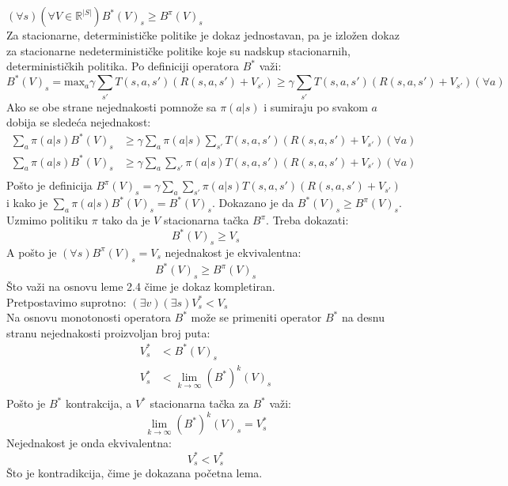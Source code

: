 \documentclass[a4paper,fleqn,12pt]{JMThesis}
\theoremstyle{plain}
\theoremstyle{definition}
\theoremstyle{definition}
\begin{document}
\lem $(\forall s) (\forall V \in \mathbb{R}^{|S|}) B^*(V)_s \geq B^{\pi}(V)_s$ \\
Za stacionarne, determinističke politike je dokaz jednostavan, pa je izložen dokaz za stacionarne nedeterminističke politike
koje su nadskup stacionarnih, determinističkih politika.
Po definiciji operatora $B^*$ važi:
\[
	B^*(V)_s = \text{max}_a \gamma \sum_{s'}T(s,a,s')(R(s,a,s')+V_{s'}) \geq \gamma \sum_{s'}T(s,a,s')(R(s,a,s')+V_{s'}) (\forall a) 
\]
Ako se obe strane nejednakosti pomnože sa $\pi(a|s)$ i sumiraju po svakom $a$ dobija se sledeća nejednakost:
\[
	\begin{split}
		\sum_{a} \pi(a|s) B^*(V)_s &\geq \gamma \sum_{a} \pi(a|s) \sum_{s'}T(s,a,s')(R(s,a,s')+V_{s'}) (\forall a)\\
		\sum_{a} \pi(a|s) B^*(V)_s &\geq \gamma \sum_{a} \sum_{s'}\pi(a|s) T(s,a,s')(R(s,a,s')+V_{s'}) (\forall a)\\
	\end{split}
\]
Pošto je definicija $B^{\pi}(V)_s = \gamma \sum_{a} \sum_{s'}\pi(a|s) T(s,a,s')(R(s,a,s')+V_{s'})$ i kako je $\sum_{a} \pi(a|s) B^*(V)_s = B^*(V)_s$.
Dokazano je da $B^*(V)_s \geq B^{\pi}(V)_s$.
\\
Uzmimo politiku $\pi$ tako da je $V$ stacionarna tačka $B^{\pi}$.
Treba dokazati:
\[ B^*(V)_s \geq V_s \]
A pošto je $(\forall s) B^{\pi}(V)_s = V_s$ nejednakost je ekvivalentna:
\[ B^*(V)_s \geq B^{\pi}(V)_s \]
Što važi na osnovu leme 2.4 čime je dokaz kompletiran.
\\
Pretpostavimo suprotno: $(\exists v)(\exists s) V^*_s < V_s$\\
Na osnovu monotonosti operatora $B^*$ može se primeniti operator $B^*$ na desnu stranu nejednakosti proizvoljan broj puta:
\[
	\begin{split}
		V^*_s &< B^*(V)_s\\
		V^*_s &< \lim_{k \to \infty}(B^*)^k(V)_s\\
	\end{split}
\]
Pošto je $B^*$ kontrakcija, a $V^*$ stacionarna tačka za $B^*$ važi:
\[ \lim_{k \to \infty}(B^*)^k(V)_s = V^*_s \]
Nejednakost je onda ekvivalentna:
\[ V^*_s < V^*_s \]
Što je kontradikcija, čime je dokazana početna lema.
\end{document}
